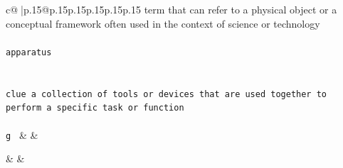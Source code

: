 \documentclass{article}
\begin{document}
{\begin{supertabular}{c@{$\;$}|p{.15\linewidth}@{}p{.15\linewidth}p{.15\linewidth}p{.15\linewidth}p{.15\linewidth}p{.15\linewidth}}
{{{term that can refer to a physical object or a conceptual framework often used in the context of science or technology\\ \tt \\ \tt  apparatus\\ \tt \\ \tt \\ \tt clue a collection of tools or devices that are used together to perform a specific task or function\\ \tt \\ \tt g 
	  } 
	   } 
	   } 
	 & & \\ 
 

    \theutterance {}  

    & & 
\end{supertabular}}
\end{document}
